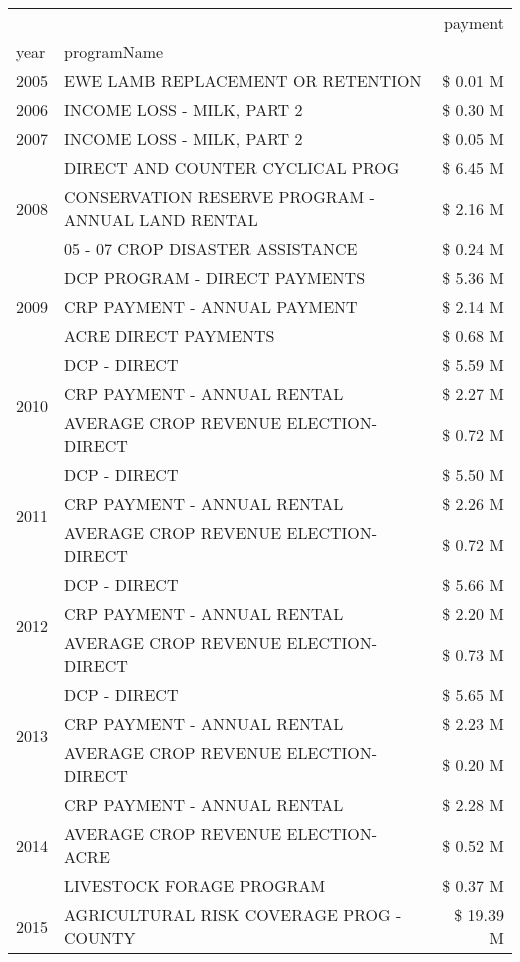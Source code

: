 \begin{tabular}{llr}
\toprule
 &  & payment \\
year & programName &  \\
\midrule
2005 & EWE LAMB REPLACEMENT OR RETENTION & \$ 0.01 M \\
\cline{1-3}
2006 & INCOME LOSS - MILK, PART 2 & \$ 0.30 M \\
\cline{1-3}
2007 & INCOME LOSS - MILK, PART 2 & \$ 0.05 M \\
\cline{1-3}
\multirow[t]{3}{*}{2008} & DIRECT AND COUNTER CYCLICAL PROG & \$ 6.45 M \\
 & CONSERVATION RESERVE PROGRAM - ANNUAL LAND RENTAL & \$ 2.16 M \\
 & 05 - 07 CROP DISASTER ASSISTANCE & \$ 0.24 M \\
\cline{1-3}
\multirow[t]{3}{*}{2009} & DCP PROGRAM - DIRECT PAYMENTS & \$ 5.36 M \\
 & CRP PAYMENT - ANNUAL PAYMENT & \$ 2.14 M \\
 & ACRE DIRECT PAYMENTS & \$ 0.68 M \\
\cline{1-3}
\multirow[t]{3}{*}{2010} & DCP - DIRECT & \$ 5.59 M \\
 & CRP PAYMENT - ANNUAL RENTAL & \$ 2.27 M \\
 & AVERAGE CROP REVENUE ELECTION-DIRECT & \$ 0.72 M \\
\cline{1-3}
\multirow[t]{3}{*}{2011} & DCP - DIRECT & \$ 5.50 M \\
 & CRP PAYMENT - ANNUAL RENTAL & \$ 2.26 M \\
 & AVERAGE CROP REVENUE ELECTION-DIRECT & \$ 0.72 M \\
\cline{1-3}
\multirow[t]{3}{*}{2012} & DCP - DIRECT & \$ 5.66 M \\
 & CRP PAYMENT - ANNUAL RENTAL & \$ 2.20 M \\
 & AVERAGE CROP REVENUE ELECTION-DIRECT & \$ 0.73 M \\
\cline{1-3}
\multirow[t]{3}{*}{2013} & DCP - DIRECT & \$ 5.65 M \\
 & CRP PAYMENT - ANNUAL RENTAL & \$ 2.23 M \\
 & AVERAGE CROP REVENUE ELECTION-DIRECT & \$ 0.20 M \\
\cline{1-3}
\multirow[t]{3}{*}{2014} & CRP PAYMENT - ANNUAL RENTAL & \$ 2.28 M \\
 & AVERAGE CROP REVENUE ELECTION-ACRE & \$ 0.52 M \\
 & LIVESTOCK FORAGE PROGRAM & \$ 0.37 M \\
\cline{1-3}
\multirow[t]{3}{*}{2015} & AGRICULTURAL RISK COVERAGE PROG - COUNTY & \$ 19.39 M \\

\end{tabular}
